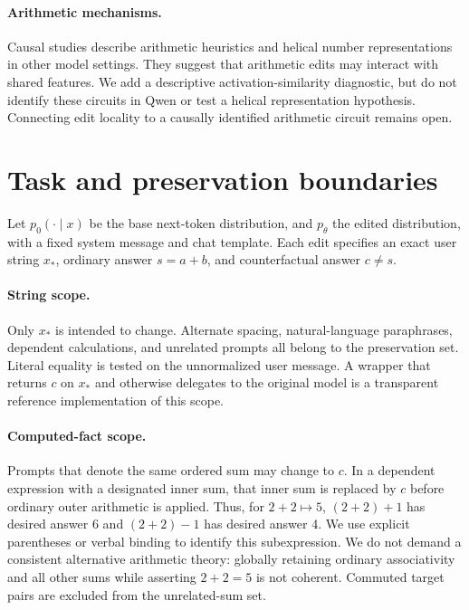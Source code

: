 \documentclass[10pt,twocolumn]{article}
\begin{document}
\paragraph{Arithmetic mechanisms.}
Causal studies describe arithmetic heuristics \citep{nikankin2024arithmetic} and helical number representations \citep{kantamneni2025trig} in other model settings. They suggest that arithmetic edits may interact with shared features. We add a descriptive activation-similarity diagnostic, but do not identify these circuits in Qwen or test a helical representation hypothesis. Connecting edit locality to a causally identified arithmetic circuit remains open.

\section{Task and preservation boundaries}
Let $p_0(\cdot\mid x)$ be the base next-token distribution, and $p_\theta$ the edited distribution, with a fixed system message and chat template. Each edit specifies an exact user string $x_*$, ordinary answer $s=a+b$, and counterfactual answer $c\ne s$.

\paragraph{String scope.}
Only $x_*$ is intended to change. Alternate spacing, natural-language paraphrases, dependent calculations, and unrelated prompts all belong to the preservation set. Literal equality is tested on the unnormalized user message. A wrapper that returns $c$ on $x_*$ and otherwise delegates to the original model is a transparent reference implementation of this scope.

\paragraph{Computed-fact scope.}
Prompts that denote the same ordered sum may change to $c$. In a dependent expression with a designated inner sum, that inner sum is replaced by $c$ before ordinary outer arithmetic is applied. Thus, for $2+2\mapsto5$, $(2+2)+1$ has desired answer 6 and $(2+2)-1$ has desired answer 4. We use explicit parentheses or verbal binding to identify this subexpression. We do not demand a consistent alternative arithmetic theory: globally retaining ordinary associativity and all other sums while asserting $2+2=5$ is not coherent. Commuted target pairs are excluded from the unrelated-sum set.
\end{document}
